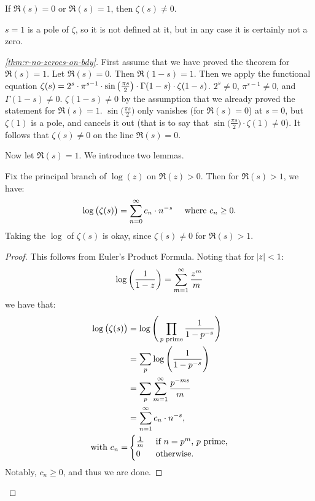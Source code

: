 \begin{theorem}\label{thm:r-no-zeroes-on-bdy}
If $\Re(s) = 0$ or $\Re(s) = 1$, then $\zeta(s) \neq 0$.
\end{theorem}
\begin{note}
$s=1$ is a pole of $\zeta$, so it is not defined at it, but in any case it is certainly not a zero.
\end{note}
\begin{proof}[\ref{thm:r-no-zeroes-on-bdy}]
First assume that we have proved the theorem for $\Re(s) = 1$. Let $\Re(s) = 0$. Then $\Re(1-s) = 1$. Then we apply the functional equation $\zeta(s) = 2^s \cdot \pi^{s-1} \cdot \sin\left( \frac{\pi s}{2} \right) \cdot \Gamma(1-s) \cdot \zeta(1-s)$. $2^s \neq 0$, $\pi^{s-1} \neq 0$, and $\Gamma(1-s) \neq 0$. $\zeta(1-s) \neq 0$ by the assumption that we already proved the statement for $\Re(s)=1$. $\sin \big( \frac{\pi s}{2} \big)$ only vanishes (for $\Re(s) = 0$) at $s=0$, but $\zeta(1)$ is a pole, and cancels it out (that is to say that $\sin \big( \frac{\pi s}{2} \big) \cdot \zeta(1) \neq 0$). It follows that $\zeta(s) \neq 0$ on the line $\Re(s) = 0$.

Now let $\Re(s) = 1$. We introduce two lemmas.
\begin{lemma}\label{lem:r-no-zeroes-on-bdy-1}
Fix the principal branch of $\log(z)$ on $\Re(z) > 0$. Then for $\Re(s) > 1$, we have:
\begin{align*}
    \log\left( \zeta(s) \right) = \sum_{n=0}^\infty c_n \cdot n^{-s} \;\;\;\;\; \text{where $c_n \geq 0$}.
\end{align*}
Taking the $\log$ of $\zeta(s)$ is okay, since $\zeta(s) \neq 0$ for $\Re(s) > 1$.
\end{lemma}
\begin{proof}
This follows from Euler's Product Formula.
Noting that for $\abs{z} < 1$:
\begin{align*}
    \log \left(  \frac{1}{1-z} \right) = \sum_{m=1}^\infty \frac{z^m}{m}
\end{align*}
we have that:
\begin{align*}
    \log\left( \zeta(s)  \right) &= \log  \Bigg( \prod_{p \text{ prime} } \frac{1}{1-p^{-s}} \Bigg) \\&= \sum_{p } \log \Bigg( \frac{1}{1-p^{-s}}\Bigg) \\&= \sum_{p } \sum_{m=1}^\infty \frac{p^{-ms}}{m} \\&= \sum_{n=1}^\infty c_n \cdot n^{-s},\\
    \text{with }c_n = &\begin{cases} \frac{1}{m} &\text{ if $n=p^m$, $p$ prime,} \\ 0 &\text{ otherwise.}\end{cases}
\end{align*}
Notably, $c_n \geq 0$, and thus we are done.
\end{proof}


\end{proof}
